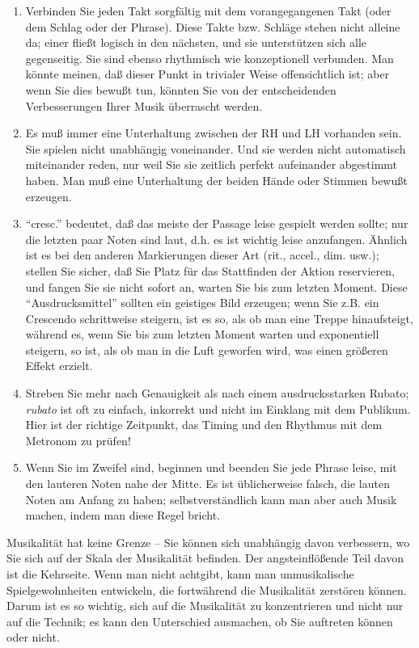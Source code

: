 \begin{enumerate}[label={\roman*.}] 
\item Verbinden Sie jeden Takt sorgfältig mit dem vorangegangenen Takt (oder dem Schlag oder der Phrase).
Diese Takte bzw. Schläge stehen nicht alleine da; einer fließt logisch in den nächsten, und sie unterstützen sich alle gegenseitig.
Sie sind ebenso rhythmisch wie konzeptionell verbunden.
Man könnte meinen, daß dieser Punkt in trivialer Weise offensichtlich ist; aber wenn Sie dies bewußt tun, könnten Sie von der entscheidenden Verbesserungen Ihrer Musik überrascht werden.

\item Es muß immer eine Unterhaltung zwischen der RH und LH vorhanden sein.
Sie spielen nicht unabhängig voneinander.
Und sie werden nicht automatisch miteinander reden, nur weil Sie sie zeitlich perfekt aufeinander abgestimmt haben.
Man muß eine Unterhaltung der beiden Hände oder Stimmen bewußt erzeugen.

\item \enquote{cresc.} bedeutet, daß das meiste der Passage leise gespielt werden sollte; nur die letzten paar Noten sind laut, d.h. es ist wichtig leise anzufangen.
Ähnlich ist es bei den anderen Markierungen dieser Art (rit., accel., dim. usw.); stellen Sie sicher, daß Sie Platz für das Stattfinden der Aktion reservieren, und fangen Sie sie nicht sofort an, warten Sie bis zum letzten Moment.
Diese \enquote{Ausdrucksmittel} sollten ein geistiges Bild erzeugen; wenn Sie z.B. ein Crescendo schrittweise steigern, ist es so, als ob man eine Treppe hinaufsteigt, während es, wenn Sie bis zum letzten Moment warten und exponentiell steigern, so ist, als ob man in die Luft geworfen wird, was einen größeren Effekt erzielt.


\item Streben Sie mehr nach Genauigkeit als nach einem ausdrucksstarken Rubato; \textit{rubato} ist oft zu einfach, inkorrekt und nicht im Einklang mit dem Publikum.
Hier ist der richtige Zeitpunkt, das Timing und den Rhythmus mit dem Metronom zu prüfen!

\item Wenn Sie im Zweifel sind, beginnen und beenden Sie jede Phrase leise, mit den lauteren Noten nahe der Mitte.
Es ist üblicherweise falsch, die lauten Noten am Anfang zu haben; selbstverständlich kann man aber auch Musik machen, indem man diese Regel bricht.
\end{enumerate}

Musikalität hat keine Grenze -- Sie können sich unabhängig davon verbessern, wo Sie sich auf der Skala der Musikalität befinden.
Der angsteinflößende Teil davon ist die Kehrseite.
Wenn man nicht achtgibt, kann man unmusikalische Spielgewohnheiten entwickeln, die fortwährend die Musikalität zerstören können.
Darum ist es so wichtig, sich auf die Musikalität zu konzentrieren und nicht nur auf die Technik; es kann den Unterschied ausmachen, ob Sie auftreten können oder nicht.

